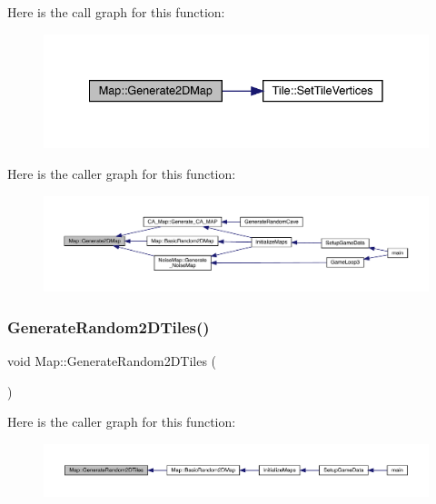 Here is the call graph for this function\+:
\nopagebreak
\begin{figure}[H]
\begin{center}
\leavevmode
\includegraphics[width=335pt]{class_map_a6e7c6b33a4b312d325eb7079f651b414_cgraph}
\end{center}
\end{figure}
Here is the caller graph for this function\+:
\nopagebreak
\begin{figure}[H]
\begin{center}
\leavevmode
\includegraphics[width=350pt]{class_map_a6e7c6b33a4b312d325eb7079f651b414_icgraph}
\end{center}
\end{figure}
\mbox{\label{class_map_a9fe61ffc95d4fc4bed052ead1c06221a}} 
\subsubsection{\texorpdfstring{Generate\+Random2\+D\+Tiles()}{GenerateRandom2DTiles()}}
{\footnotesize\ttfamily void Map\+::\+Generate\+Random2\+D\+Tiles (\begin{DoxyParamCaption}{ }\end{DoxyParamCaption})}

Here is the caller graph for this function\+:
\nopagebreak
\begin{figure}[H]
\begin{center}
\leavevmode
\includegraphics[width=350pt]{class_map_a9fe61ffc95d4fc4bed052ead1c06221a_icgraph}
\end{center}
\end{figure}
\mbox{\label{class_map_ae9cd08e70d2549c046acbfab085d421c}} 
